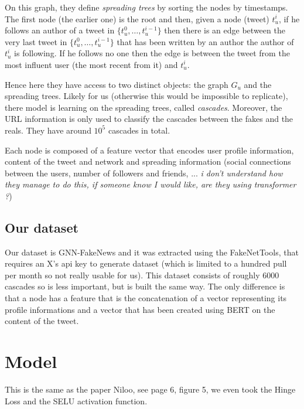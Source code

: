\documentclass[sigconf]{acmart}
\begin{document}
On this graph, they define \emph{spreading trees} by sorting the nodes by timestamps. The first node (the earlier one) is the root and then, given a node (tweet) $t_u^i$, if he follows an author of a tweet in $\{t_u^0,\dots,t_u^{i-1}\}$ then there is an edge between the very last tweet in $\{t_u^0,\dots,t_u^{i-1}\}$ that has been written by an author the author of $t_u^i$ is following. If he follows no one then the edge is between the tweet from the most influent user (the most recent from it) and $t_u^i$.

Hence here they have access to two distinct objects: the graph $G_u$ and the spreading trees. Likely for us (otherwise this would be impossible to replicate), there model is learning on the spreading trees, called \emph{cascades}. Moreover, the URL information is only used to classify the cascades between the fakes and the reals. They have around $10^5$ cascades in total. 

Each node is composed of a feature vector that encodes user profile information, content of the tweet and network and spreading information (social connections between the users, number of followers and friends, ... \emph{i don't understand how they manage to do this, if someone know I would like, are they using transformer ?})
\subsection{Our dataset}

Our dataset is GNN-FakeNews and it was extracted using the FakeNetTools, that requires an X's api key to generate dataset (which is limited to a hundred pull per month so not really usable for us). This dataset consists of roughly 6000 cascades so is less important, but is built the same way. The only difference is that a node has a feature that is the concatenation of a vector representing its profile informations and a vector that has been created using BERT on the content of the tweet.

\section{Model}

This is the same as the paper Niloo, see page 6, figure 5, we even took the Hinge Loss and the SELU activation function.
\end{document}
